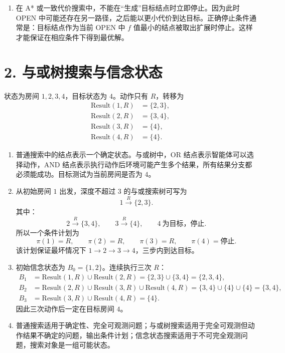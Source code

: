 \documentclass[UTF8,zihao=-4]{ctexart}
\newcommand{\set}[1]{\{#1\}}
\begin{document}
\begin{enumerate}[label=(\arabic*)]
一致性要求对每条边 $u\to v$ 都满足
\[
h(u)\le c(u,v)+h(v).
\]
大多数边满足，但
\[
D\to E:\qquad h(D)=4>1+h(E)=3.
\]
因此该启发函数不一致。

\item 在 A* 或一致代价搜索中，不能在“生成”目标结点时立即停止。因为此时 OPEN 中可能还存在另一路径，之后能以更小代价到达目标。正确停止条件通常是：目标结点作为当前 OPEN 中 $f$ 值最小的结点被取出扩展时停止。这样才能保证在相应条件下得到最优解。
\end{enumerate}

\section*{2. 与或树搜索与信念状态}

状态为房间 $1,2,3,4$，目标状态为 $4$。动作只有 $R$，转移为
\[
\begin{aligned}
\mathrm{Result}(1,R)&=\set{2,3},\\
\mathrm{Result}(2,R)&=\set{3,4},\\
\mathrm{Result}(3,R)&=\set{4},\\
\mathrm{Result}(4,R)&=\set{4}.
\end{aligned}
\]

\begin{enumerate}[label=(\arabic*)]
\item 普通搜索中的结点表示一个确定状态。与或树中，OR 结点表示智能体可以选择动作，AND 结点表示执行动作后环境可能产生多个结果，所有结果分支都必须能成功。目标测试为当前房间是否为 $4$。

\item 从初始房间 $1$ 出发，深度不超过 $3$ 的与或搜索树可写为
\[
1 \xrightarrow{R} \set{2,3}.
\]
其中：
\[
2\xrightarrow{R}\set{3,4},\qquad 3\xrightarrow{R}\set{4},\qquad 4\ \text{为目标，停止}.
\]
所以一个条件计划为
\[
\pi(1)=R,\qquad \pi(2)=R,\qquad \pi(3)=R,\qquad \pi(4)=\text{停止}.
\]
该计划保证最坏情况下 $1\to 2\to 3\to 4$，三步内到达目标。

\item 初始信念状态为 $B_0=\set{1,2}$。连续执行三次 $R$：
\[
\begin{aligned}
B_1&=\mathrm{Result}(1,R)\cup \mathrm{Result}(2,R)=\set{2,3}\cup \set{3,4}=\set{2,3,4},\\
B_2&=\mathrm{Result}(2,R)\cup \mathrm{Result}(3,R)\cup \mathrm{Result}(4,R)=\set{3,4}\cup\set{4}\cup\set{4}=\set{3,4},\\
B_3&=\mathrm{Result}(3,R)\cup\mathrm{Result}(4,R)=\set{4}.
\end{aligned}
\]
因此三次动作后一定在目标房间 $4$。

\item 普通搜索适用于确定性、完全可观测问题；与或树搜索适用于完全可观测但动作结果不确定的问题，输出条件计划；信念状态搜索适用于不可完全观测问题，搜索对象是一组可能状态。
\end{enumerate}
\end{document}
